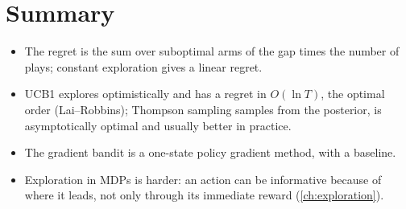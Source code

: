 \section{Summary}

\begin{itemize}[nosep]
  \item The regret is the sum over suboptimal arms of the gap times the
    number of plays; constant exploration gives a linear regret.
  \item UCB1 explores optimistically and has a regret in $O(\ln T)$, the
    optimal order (Lai--Robbins); Thompson sampling samples from the
    posterior, is asymptotically optimal and usually better in practice.
  \item The gradient bandit is a one-state policy gradient method, with a
    baseline.
  \item Exploration in MDPs is harder: an action can be informative
    because of where it leads, not only through its immediate reward
    (\cref{ch:exploration}).
\end{itemize}
